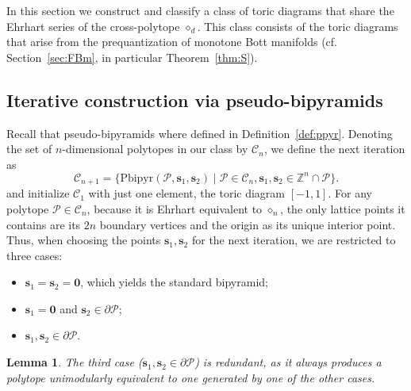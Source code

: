 \documentclass[a4paper,11pt,reqno]{amsart}
\newtheorem{lemma}[theorem]{Lemma}
\begin{document}
In this section we construct and classify a class of toric diagrams that share the Ehrhart series of the 
cross-polytope $\diamond_d$. This class consists of the toric diagrams that arise from the 
prequantization of monotone Bott manifolds (cf. Section~\ref{sec:FBm}, in particular Theorem~\ref{thm:S}).

\subsection{Iterative construction via pseudo-bipyramids}
Recall that pseudo-bipyramids where defined in Definition~\ref{def:ppyr}.
Denoting the set of $n$-dimensional polytopes in our class by $\mathcal{C}_n$, we define the next iteration as
\[
\mathcal{C}_{n+1}=\{ \text{Pbipyr} (\mathcal{P}, \bm{s}_1, \bm{s}_2) \mid \mathcal{P} \in \mathcal{C}_{n}, 
\bm{s}_1, \bm{s}_2 \in \mathbb{Z}^n \cap \mathcal{P} \}.
\]
and initialize $\mathcal{C}_1$ with just one element, the toric diagram $[-1,1]$. For any polytope 
$\mathcal{P} \in \mathcal{C}_n$, because it is Ehrhart equivalent to $\diamond_n$, the only lattice points 
it contains are its $2n$ boundary vertices and the origin as its unique interior point. Thus, when choosing 
the points $\bm{s}_1, \bm{s}_2$ for the next iteration, we are restricted to three cases:
\begin{itemize}
\item $\bm{s}_1=\bm{s}_2=\bm{0}$, which yields the standard bipyramid;
\item $\bm{s}_1=\bm{0}$ and $\bm{s}_2 \in \partial \mathcal{P} $;
\item $\bm{s}_1, \bm{s}_2 \in \partial \mathcal{P} $.
\end{itemize}
\begin{lemma}
The third case ($\bm{s}_1, \bm{s}_2 \in \partial \mathcal{P}$) is redundant, as it always produces a polytope 
unimodularly equivalent to one generated by one of the other cases.
\end{lemma}
\end{document}

